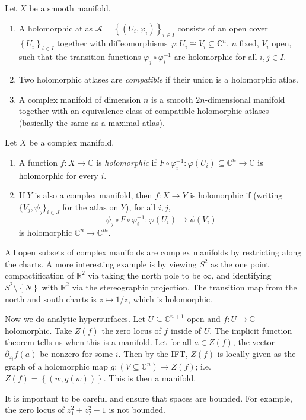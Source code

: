 \begin{definition}[Laz 2.1]\label{awooo}
	Let $X$ be a smooth manifold.
	\begin{enumerate}
		\item A holomorphic atlas $\mathcal{A} =\left\{ (U_i,\varphi _i) \right\} _{i\in I} $ consists of an open cover $\left\{ U_i \right\} _{i\in I} $ together with diffeomorphisms $\varphi : U_i \cong V_i \subseteq \mathbb{C} ^n$, $n$ fixed, $V_i$ open, such that the transition functions $\varphi _j \circ \varphi _i^{-1} $ are holomorphic for all $i,j\in I$.
		\item Two holomorphic atlases are \emph{compatible} if their union is a holomorphic atlas.
		\item A complex manifold of dimension $n$ is a smooth $2n$-dimensional manifold together with an equivalence class of compatible holomorphic atlases (basically the same as a maximal atlas).
	\end{enumerate}
\end{definition}
\begin{definition}[Laz 2.2]\label{awoooo}
	Let $X$ be a complex manifold.
	\begin{enumerate}
		\item A function $f : X \to \mathbb{C} $ is \emph{holomorphic} if $F\circ \varphi _i^{-1} : \varphi (U_i)\subseteq \mathbb{C} ^n \to \mathbb{C} $ is holomorphic for every $i$.
		\item If $Y$ is also a complex manifold, then $f : X \to Y$ is holomorphic if (writing $\{V_j,\psi _j\}_{i\in J}  $ for the atlas on $Y$), for all $i,j$,
			\[
				\psi _j \circ F \circ \varphi _i^{-1} : \varphi (U_i) \to \psi (V_i)
			\]
			is holomorphic $\mathbb{C} ^n\to \mathbb{C} ^m$.
	\end{enumerate}
\end{definition}

\begin{example}
	All open subsets of complex manifolds are complex manifolds by restricting along the charts. A more interesting example is by viewing $S^2$ as the one point compactification of $\mathbb{R} ^2$ via taking the north pole to be $\infty $, and identifying $S^2\setminus \left\{ N \right\} $ with $\mathbb{R} ^2$ via the stereographic projection. The transition map from the north and south charts is $z\mapsto 1/z$, which is holomorphic.

	Now we do analytic hypersurfaces. Let $U\subseteq \mathbb{C} ^{n+1} $ open and $f : U \to \mathbb{C} $ holomorphic. Take $Z(f)$ the zero locus of $f$ inside of $U$. The implicit function theorem tells us when this is a manifold. Let for all $a\in Z(f)$, the vector $\partial _{z_i} f(a)$ be nonzero for some $i$. Then by the IFT, $Z(f)$ is locally given as the graph of a holomorphic map $g:(V\subseteq \mathbb{C} ^n)\to Z(f)$; i.e. $Z(f)=\left\{ (w,g(w)) \right\} $. This is then a manifold.

	It is important to be careful and ensure that spaces are bounded. For example, the zero locus of $z_1^2+z_2^2-1$ is not bounded.
\end{example}

